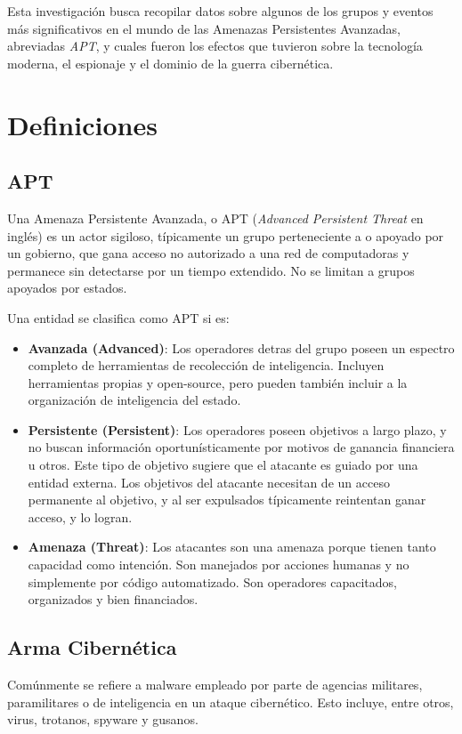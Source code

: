 \documentclass{article}
\begin{document}
Esta investigación busca recopilar datos sobre algunos de los grupos y eventos más significativos en el mundo de las Amenazas Persistentes Avanzadas, abreviadas {\it APT}, y cuales fueron los efectos que tuvieron sobre la tecnología moderna, el espionaje y el dominio de la guerra cibernética.

\section{Definiciones}
\subsection{APT}
Una Amenaza Persistente Avanzada, o APT ({\it Advanced Persistent Threat} en inglés) es un actor sigiloso, típicamente un grupo perteneciente a o apoyado por un gobierno, que gana acceso no autorizado a una red de computadoras y permanece sin detectarse por un tiempo extendido. No se limitan a grupos apoyados por estados. \autocite{cybereason-apt} 

Una entidad se clasifica como APT si es:
\begin{itemize}
    \item {\bf Avanzada (Advanced)}: Los operadores detras del grupo poseen un espectro completo de herramientas de recolección de inteligencia. Incluyen herramientas propias y open-source, pero pueden también incluir a la organización de inteligencia del estado.
    \item {\bf Persistente (Persistent)}: Los operadores poseen objetivos a largo plazo, y no buscan información oportunísticamente por motivos de ganancia financiera u otros. Este tipo de objetivo sugiere que el atacante es guiado por una entidad externa. Los objetivos del atacante necesitan de un acceso permanente al objetivo, y al ser expulsados típicamente reintentan ganar acceso, y lo logran.
    \item {\bf Amenaza (Threat)}: Los atacantes son una amenaza porque tienen tanto capacidad como intención. Son manejados por acciones humanas y no simplemente por código automatizado. Son operadores capacitados, organizados y bien financiados. \autocite{itgov-apt}
\end{itemize}

\subsection{Arma Cibernética}
Comúnmente se refiere a malware empleado por parte de agencias militares, paramilitares o de inteligencia en un ataque cibernético. Esto incluye, entre otros, virus, trotanos, spyware y gusanos.
\end{document}
